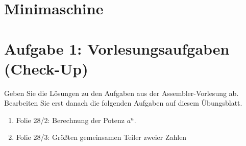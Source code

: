 \documentclass{lehramt-informatik-aufgabe}
\begin{document}
\section{Minimaschine}

\section{Aufgabe 1: Vorlesungsaufgaben (Check-Up)}

Geben Sie die Lösungen zu den Aufgaben aus der Assembler-Vorlesung
ab. Bearbeiten Sie erst danach die folgenden Aufgaben auf diesem
Übungsblatt.

\begin{enumerate}


\item Folie 28/2: Berechnung der Potenz $a^n$.

\begin{multicols}{2}


\liSpaltenUmbruch
{}

\end{multicols}


\newpage

\item Folie 28/3: Größten gemeinsamen Teiler zweier Zahlen

\begin{multicols}{2}


\liSpaltenUmbruch
{}

\end{multicols}
\end{enumerate}
\end{document}
